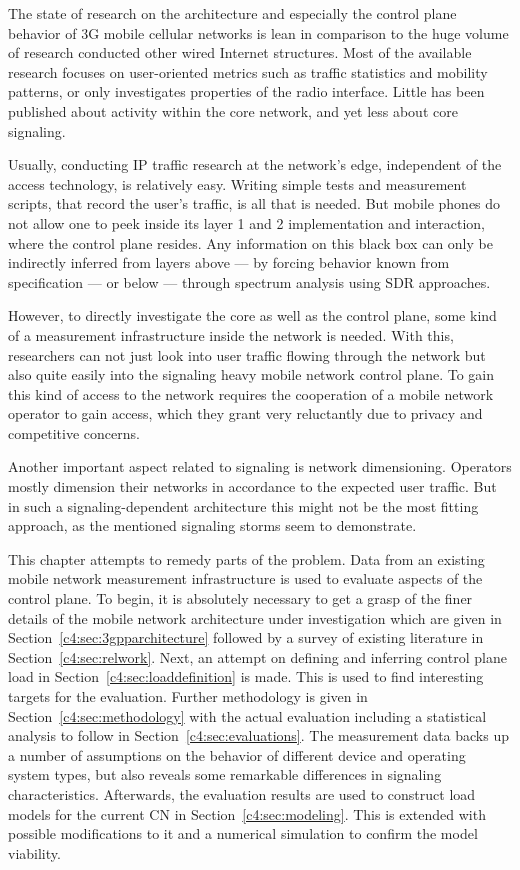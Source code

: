 The state of research on the architecture and especially the control plane behavior of \gls{3G} mobile cellular networks is lean in comparison to the huge volume of research conducted other wired Internet structures. Most of the available research focuses on user-oriented metrics such as traffic statistics and mobility patterns, or only investigates properties of the radio interface. Little has been published about activity within the core network, and yet less about core signaling. 

Usually, conducting \gls{IP} traffic research at the network's edge, independent of the access technology, is relatively easy. Writing simple tests and measurement scripts, that record the user's traffic, is all that is needed. But mobile phones do not allow one to peek inside its layer 1 and 2 implementation and interaction, where the control plane resides. Any information on this black box can only be indirectly inferred from layers above --- by forcing behavior known from specification --- or below --- through spectrum analysis using \gls{SDR} approaches. 

However, to directly investigate the core as well as the control plane, some kind of a measurement infrastructure inside the network is needed. With this, researchers can not just look into user traffic flowing through the network but also quite easily into the signaling heavy mobile network control plane. To gain this kind of access to the network requires the cooperation of a mobile network operator to gain access, which they grant very reluctantly due to privacy and competitive concerns.

Another important aspect related to signaling is network dimensioning. Operators mostly dimension their networks in accordance to the expected user traffic. But in such a signaling-dependent architecture this might not be the most fitting approach, as the mentioned signaling storms seem to demonstrate. 

This chapter attempts to remedy parts of the problem. Data from an existing mobile network measurement infrastructure is used to evaluate aspects of the control plane. 
To begin, it is absolutely necessary to get a grasp of the finer details of the mobile network architecture under investigation which are given in Section~\ref{c4:sec:3gpparchitecture} followed by a survey of existing literature in Section~\ref{c4:sec:relwork}. Next, an attempt on defining and inferring control plane load in Section~\ref{c4:sec:loaddefinition} is made. This is used to find interesting targets for the evaluation.
Further methodology is given in Section~\ref{c4:sec:methodology} with the  actual evaluation including a statistical analysis to follow in Section~\ref{c4:sec:evaluations}. The measurement data backs up a number of assumptions on the behavior of different device and operating system types, but also reveals some remarkable differences in signaling characteristics. Afterwards, the evaluation results are used to construct load models for the current \gls{CN} in Section~\ref{c4:sec:modeling}. This is extended with possible modifications to it and a numerical simulation to confirm the model viability.



